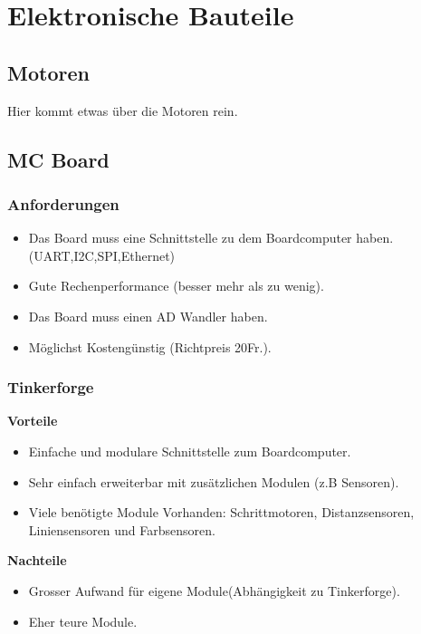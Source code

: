 \section{Elektronische Bauteile}
\subsection {Motoren}
Hier kommt etwas über die Motoren rein.

\subsection*{MC Board}
\subsubsection{Anforderungen}
\begin{itemize}
\item Das Board muss eine Schnittstelle zu dem Boardcomputer haben. (UART,I2C,SPI,Ethernet)
\item Gute Rechenperformance (besser mehr als zu wenig).
\item Das Board muss einen AD Wandler haben.
\item Möglichst Kostengünstig (Richtpreis 20Fr.).
\end{itemize}


\subsubsection{Tinkerforge}
\textbf {Vorteile}
\begin{itemize}
\item Einfache und modulare Schnittstelle zum Boardcomputer.
\item Sehr einfach erweiterbar mit zusätzlichen Modulen (z.B Sensoren).
\item Viele benötigte Module Vorhanden: Schrittmotoren, Distanzsensoren, Liniensensoren und Farbsensoren.\\
\end{itemize}
\textbf {Nachteile}
\begin{itemize}
\item Grosser Aufwand für eigene Module(Abhängigkeit zu Tinkerforge).
\item Eher teure Module.
\end{itemize}

